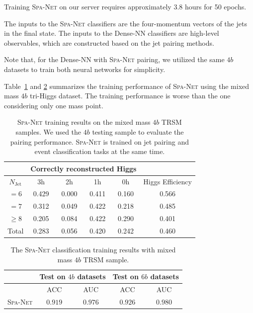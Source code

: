 \documentclass[12pt]{article}
\begin{document}
        Training \textsc{Spa-Net} on our server requires approximately 3.8 hours for 50 epochs.

        The inputs to the \textsc{Spa-Net} classifiers are the four-momentum vectors of the jets in the final state. The inputs to the Dense-NN classifiers are high-level observables, which are constructed based on the jet pairing methods. 

        Note that, for the Dense-NN with \textsc{Spa-Net} pairing, we utilized the same $4b$ datasets to train both neural networks for simplicity.

        Table~\ref{tab:SPANet_triHiggs_TRSM_4b_mix_4_1M_cls_pairing_results-TRSM} and \ref{tab:SPANet_triHiggs_TRSM_4b_mix_4_1M_cls_classification_results-TRSM} summarizes the training performance of \textsc{Spa-Net} using the mixed mass $4b$ tri-Higgs dataset. The training performance is worse than the one considering only one mass point.
        \begin{table}[htpb]
            \centering
            \caption{\textsc{Spa-Net} training results on the mixed mass $4b$ TRSM samples. We used the $4b$ testing sample to evaluate the pairing performance. \textsc{Spa-Net} is trained on jet pairing and event classification tasks at the same time.}
            \label{tab:SPANet_triHiggs_TRSM_4b_mix_4_1M_cls_pairing_results-TRSM}
            \begin{tabular}{c|cccc|c}
                           & \multicolumn{4}{c|}{Correctly reconstructed Higgs} &                  \\ \hline
            $N_\text{Jet}$ & 3h          & 2h         & 1h         & 0h         & Higgs Efficiency \\ \hline
            $=6$           & 0.429 & 0.000 & 0.411 & 0.160 & 0.566            \\
            $=7$           & 0.312 & 0.049 & 0.422 & 0.218 & 0.485            \\
            $\ge 8$        & 0.205 & 0.084 & 0.422 & 0.290 & 0.401            \\ \hline
            Total          & 0.283 & 0.056 & 0.420 & 0.242 & 0.460
            \end{tabular}
        \end{table}
        \begin{table}[htpb]
            \centering
            \caption{The \textsc{Spa-Net} classification training results with mixed mass $4b$ TRSM sample.}
            \label{tab:SPANet_triHiggs_TRSM_4b_mix_4_1M_cls_classification_results-TRSM}
            \begin{tabular}{c|cc|cc}
                             & \multicolumn{2}{c|}{Test on $4b$ datasets}& \multicolumn{2}{c}{Test on $6b$ datasets} \\ \hline
                             & ACC                 & AUC                 & ACC                 & AUC                 \\ \hline
            \textsc{Spa-Net} & $0.919$             & $0.976$             & $0.926$             & $0.980$
            \end{tabular}
        \end{table}
\end{document}

